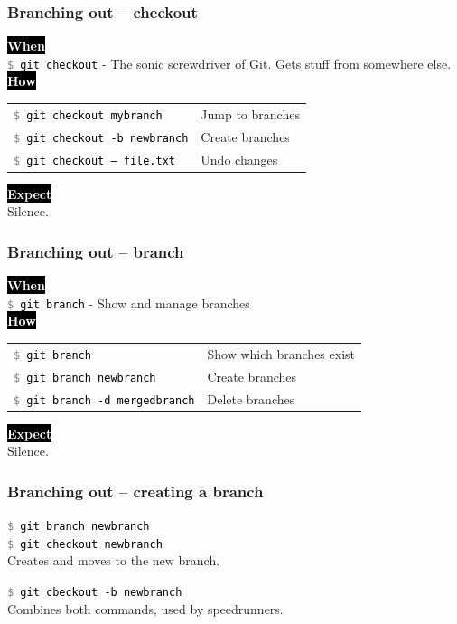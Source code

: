 \documentclass{beamer}
\newcommand{\keyword}[1]{\hspace{-1.0em}\colorbox{black}{\textcolor{white}{\textbf{#1}\vphantom{Ep}}}\vspace{0.2em}} %
\newcommand{\command}[1]{\colorbox{black!90!white!10!}{\vphantom{Ep}\texttt{\textcolor{gray}{\$} \textcolor{black}{#1}}}}
\begin{document}
\begin{frame}
  \frametitle{Branching out -- checkout}

    \keyword{When} \\
    \command{git checkout} - The sonic screwdriver of Git. Gets stuff from somewhere else. \\[1em]

    \keyword{How} \\
    \hspace{-0.95em}
    \begin{tabular}{ll}
        \command{git checkout mybranch} & Jump to branches \\
        \command{git checkout -b newbranch} & Create branches \\
        \command{git checkout -- file.txt} & Undo changes \\
    \end{tabular}

    \vspace{1em}
    \keyword{Expect} \\
    Silence.

\end{frame}

\begin{frame}
  \frametitle{Branching out -- branch}

    \keyword{When} \\
    \command{git branch} - Show and manage branches \\[1em]

    \keyword{How} \\
    \hspace{-0.95em}
    \begin{tabular}{ll}
        \command{git branch} & Show which branches exist \\ 
        \command{git branch newbranch} & Create branches \\
        \command{git branch -d mergedbranch} & Delete branches \\
    \end{tabular}

    \vspace{1em}
    \keyword{Expect} \\
    Silence.
\end{frame}

\begin{frame}
  \frametitle{Branching out -- creating a branch}

  \command{git branch newbranch} \\
  \command{git checkout newbranch} \\
  Creates and moves to the new branch.
  \vspace{1em}

  \command{git cbeckout -b newbranch} \\
  Combines both commands, used by speedrunners.

\end{frame}
\end{document}
